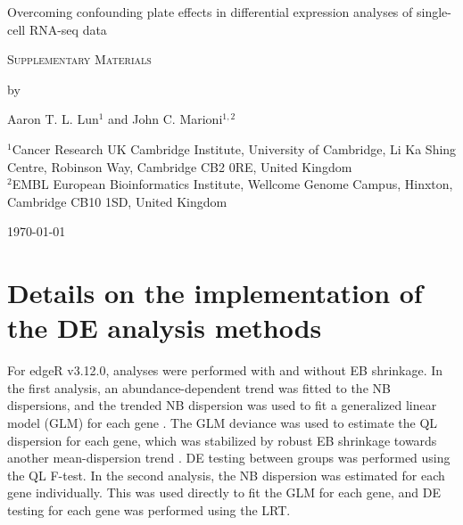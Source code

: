 \documentclass{article}
\begin{document}
\begin{titlepage}
\vspace*{3cm}
\begin{center}

{\LARGE
Overcoming confounding plate effects in differential expression analyses of single-cell RNA-seq data
\par}

\vspace{0.75cm}

{\Large 
    \textsc{Supplementary Materials}
\par
}
\vspace{0.75cm}

\large
by

\vspace{0.75cm}
Aaron T. L. Lun$^{1}$ and John C. Marioni$^{1,2}$

\vspace{1cm}
\begin{minipage}{0.9\textwidth}
\begin{flushleft} 
$^1$Cancer Research UK Cambridge Institute, University of Cambridge, Li Ka Shing Centre, Robinson Way, Cambridge CB2 0RE, United Kingdom \\[6pt]
$^2$EMBL European Bioinformatics Institute, Wellcome Genome Campus, Hinxton, Cambridge CB10 1SD, United Kingdom \\[6pt]
\end{flushleft}
\end{minipage}

\vspace{1.5cm}
{\large \today{}}

\vspace*{\fill}
\end{center}
\end{titlepage}


\section{Details on the implementation of the DE analysis methods}
For edgeR v3.12.0, analyses were performed with and without EB shrinkage.
In the first analysis, an abundance-dependent trend was fitted to the NB dispersions, 
    and the trended NB dispersion was used to fit a generalized linear model (GLM) for each gene \citep{mccarthy2012differential}.
The GLM deviance was used to estimate the QL dispersion for each gene, 
    which was stabilized by robust EB shrinkage towards another mean-dispersion trend \citep{lund2012detecting}.
DE testing between groups was performed using the QL F-test.
In the second analysis, the NB dispersion was estimated for each gene individually.
This was used directly to fit the GLM for each gene, and DE testing for each gene was performed using the LRT.
\end{document}
